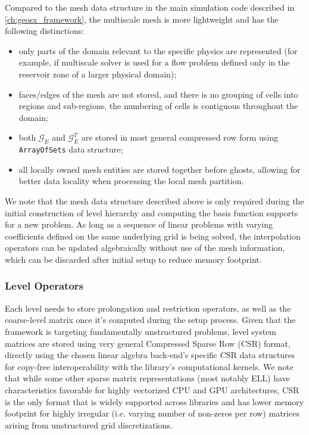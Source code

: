 Compared to the mesh data structure in the main simulation code described in \cref{ch:geosx_framework}, the multiscale mesh is more lightweight and has the following distinctions:
\begin{itemize}
    \item only parts of the domain relevant to the specific physics are represented (for example, if multiscale solver is used for a flow problem defined only in the reservoir zone of a larger physical domain);
    \item faces/edges of the mesh are not stored, and there is no grouping of cells into regions and sub-regions, the numbering of cells is contiguous throughout the domain;
    \item both $\mathcal{G}_E$ and $\mathcal{G}_E^T$ are stored in most general compressed row form using \texttt{ArrayOfSets} data structure;
    \item all locally owned mesh entities are stored together before ghosts, allowing for better data locality when processing the local mesh partition.
\end{itemize}

We note that the mesh data structure described above is only required during the initial construction of level hierarchy and computing the basis function supports for a new problem.   As long as a sequence of linear problems with varying coefficients defined on the same underlying grid is being solved, the interpolation operators can be updated algebraically without use of the mesh information, which can be discarded after initial setup to reduce memory footprint.

\subsubsection{Level Operators}

Each level needs to store prolongation and restriction operators, as well as the coarse-level matrix once it's computed during the setup process.   Given that the framework is targeting fundamentally unstructured problems, level system matrices are stored using very general Compressed Sparse Row (CSR) format, directly using the chosen linear algebra back-end's specific CSR data structures for copy-free interoperability with the library's computational kernels.   We note that while some other sparse matrix representations (most notably ELL) have characteristics favorable for highly vectorized CPU and GPU architectures, CSR is the only format that is widely supported across libraries and has lower memory footprint for highly irregular (i.e. varying number of non-zeros per row) matrices arising from unstructured grid discretizations.

